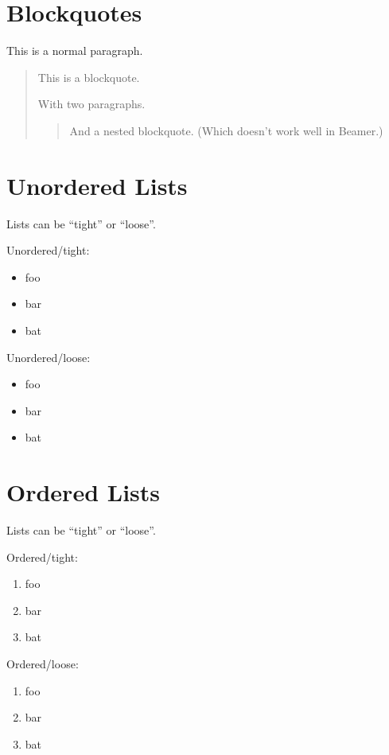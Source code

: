 \section{Blockquotes}
\label{blockquotes}

This is a normal paragraph.

\begin{quote}
This is a blockquote.

With two paragraphs.

\begin{quote}
And a nested blockquote.
(Which doesn't work well in Beamer.)
\end{quote}
\end{quote}

\section{Unordered Lists}
\label{unorderedlists}

Lists can be ``tight'' or ``loose''.

Unordered/tight:

\begin{itemize}
\item foo
\item bar
\item bat
\end{itemize}

Unordered/loose:

\begin{itemize}
\item foo
\item bar
\item bat
\end{itemize}

\section{Ordered Lists}
\label{orderedlists}

Lists can be ``tight'' or ``loose''.

Ordered/tight:

\begin{enumerate}
\item foo
\item bar
\item bat
\end{enumerate}

Ordered/loose:

\begin{enumerate}
\item foo
\item bar
\item bat
\end{enumerate}

